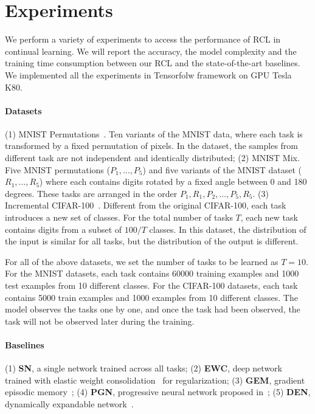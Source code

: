 \documentclass{article}
\begin{document}
\section{Experiments}
\label{sec:exp}
We perform a variety of experiments to access the performance of RCL in continual learning. We will report the accuracy, the model complexity and the training time consumption between our RCL and the state-of-the-art baselines. We implemented all the experiments in Tensorfolw framework on GPU Tesla K80.

\paragraph{Datasets}
(1) MNIST Permutations~\cite{kirkpatrick1}. Ten variants of the MNIST data, where each task is transformed by a fixed permutation of
pixels. In the dataset, the samples from different task are not independent and identically distributed;
(2) MNIST Mix. Five MNIST permutations ($P_1,\dots,P_5$) and five variants of the MNIST dataset ($R_1,\dots,R_5$) where each contains digits rotated by a fixed angle between 0 and 180 degrees. These tasks are arranged in the order $P_1,R_1, P_2,\dots,P_5,R_5$.
(3) Incremental CIFAR-100~\cite{icart}. Different from the original CIFAR-100, each task introduces a new set of classes. For the total number of tasks $T$, each new task contains digits from a subset of $100/T$ classes. In this dataset, the distribution of the input is similar for all tasks, but the distribution of the output is different.

For all of the above datasets, we set the number of tasks to be learned as $T = 10$. For the MNIST datasets, each task contains 60000 training examples and 1000 test examples from 10 different classes. For the CIFAR-100 datasets, each task contains 5000 train examples and 1000 examples from 10 different classes. The model observes the tasks one by one, and once the task had been observed, the task will not be observed later during the training.


\paragraph{Baselines}
(1) \textbf{SN}, a single network trained across all tasks;
(2) \textbf{EWC}, deep network trained with elastic weight consolidation~\cite{kirkpatrick1} for regularization;
(3) \textbf{GEM}, gradient episodic memory~\cite{GradientEpisodicMemory};
(4) \textbf{PGN}, progressive neural network proposed in~\cite{rusu1};
(5) \textbf{DEN}, dynamically expandable network~\cite{yoon1}.
\end{document}
